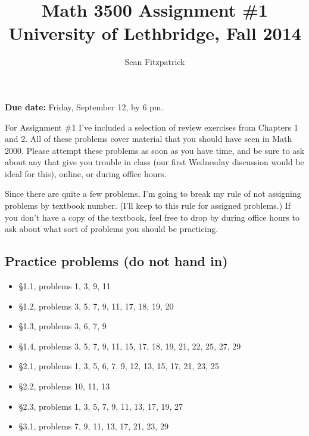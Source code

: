\documentclass[letterpaper,12pt]{article}
\title{Math 3500 Assignment \#1\\University of Lethbridge, Fall 2014}
\author{Sean Fitzpatrick}
\begin{document}
 \maketitle

{\bf Due date:} Friday, September 12, by 6 pm.

\bigskip

For Assignment \#1 I've included a selection of review exercises from Chapters 1 and 2. All of these problems cover material that you should have seen in Math 2000. Please attempt these problems as soon as you have time, and be sure to ask about any that give you trouble in class (our first Wednesday discussion would be ideal for this), online, or during office hours.

Since there are quite a few problems, I'm going to break my rule of not assigning problems by textbook number. (I'll keep to this rule for assigned problems.) If you don't have a copy of the textbook, feel free to drop by during office hours to ask about what sort of problems you should be practicing. 

\subsection*{Practice problems (do not hand in)}
\begin{itemize}
 \item \S 1.1, problems 1, 3, 9, 11
 \item \S 1.2, problems 3, 5, 7, 9, 11, 17, 18, 19, 20
 \item \S 1.3, problems 3, 6, 7, 9
 \item \S 1.4, problems 3, 5, 7, 9, 11, 15, 17, 18, 19, 21, 22, 25, 27, 29
 \item \S 2.1, problems 1, 3, 5, 6, 7, 9, 12, 13, 15, 17, 21, 23, 25
 \item \S 2.2, problems 10, 11, 13
 \item \S 2.3, problems 1, 3, 5, 7, 9, 11, 13, 17, 19, 27
 \item \S 3.1, problems 7, 9, 11, 13, 17, 21, 23, 29
\end{itemize}
\newpage
\end{document}
